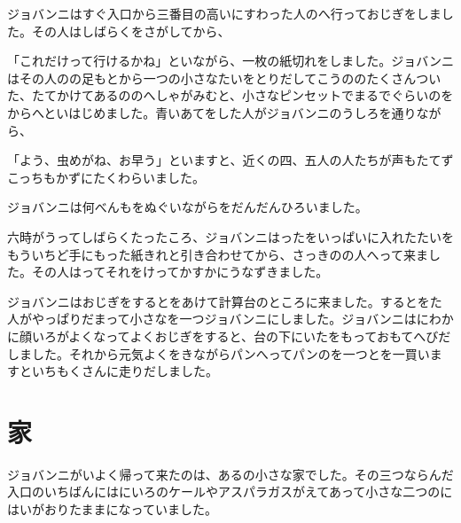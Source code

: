 ジョバンニはすぐ入口から三番目の高いにすわった人のへ行っておじぎをしました。その人はしばらくをさがしてから、

「これだけって行けるかね」といながら、一枚の紙切れをしました。ジョバンニはその人のの足もとから一つの小さなたいをとりだしてこうののたくさんついた、たてかけてあるののへしゃがみむと、小さなピンセットでまるでぐらいのをからへといはじめました。青いあてをした人がジョバンニのうしろを通りながら、

「よう、虫めがね、お早う」といますと、近くの四、五人の人たちが声もたてずこっちもかずにたくわらいました。

ジョバンニは何べんもをぬぐいながらをだんだんひろいました。

六時がうってしばらくたったころ、ジョバンニはったをいっぱいに入れたたいをもういちど手にもった紙きれと引き合わせてから、さっきのの人へって来ました。その人はってそれをけってかすかにうなずきました。

ジョバンニはおじぎをするとをあけて計算台のところに来ました。するとをた人がやっぱりだまって小さなを一つジョバンニにしました。ジョバンニはにわかに顔いろがよくなってよくおじぎをすると、台の下にいたをもっておもてへびだしました。それから元気よくをきながらパンへってパンのを一つとを一買いますといちもくさんに走りだしました。

\chapter{家}

ジョバンニがいよく帰って来たのは、あるの小さな家でした。その三つならんだ入口のいちばんにはにいろのケールやアスパラガスがえてあって小さな二つのにはいがおりたままになっていました。

